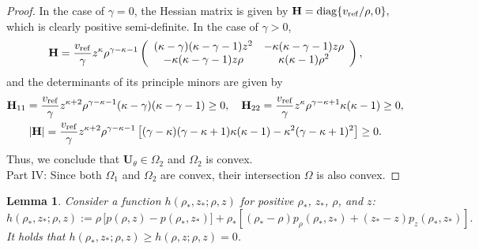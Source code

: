 \documentclass[times,final]{elsarticle}
\newtheorem{lemma}[theorem]{Lemma}
\numberwithin{equation}{section}
\theoremstyle{definition}
\theoremstyle{remark}
\newcommand{\BU}{\mathbf{U}}
\begin{document}
\begin{proof}
	In the case of $\gamma = 0$, the Hessian matrix is given by
	\(
	\mathbf{H}
	= {\rm diag}\{ v_{\rm ref}/\rho, 0  \}, 
	\)
	which is clearly positive semi-definite.
	In the case of $\gamma > 0$,
	\[
	\mathbf{H}
	=
	\frac{v_{\rm ref}}{\gamma}z^{\kappa}\rho^{\gamma-\kappa-1}
	\left(\begin{array}{cc} 
		(\kappa-\gamma)(\kappa-\gamma-1) z^2
		& -\kappa(\kappa-\gamma-1)z\rho \\ 
		-\kappa(\kappa-\gamma-1)z\rho
		& \kappa (\kappa-1) \rho^2
	\end{array}\right),
	\]
	and the determinants of its principle minors are given by
	\begin{gather*}
		\mathbf{H}_{11}
		= 
		\frac{v_{\rm ref}}{\gamma}z^{\kappa+2}\rho^{\gamma-\kappa-1}
		(\kappa-\gamma)(\kappa-\gamma-1)
		\ge 0,
		\quad
		\mathbf{H}_{22}
		= 
		\frac{v_{\rm ref}}{\gamma}z^{\kappa}\rho^{\gamma-\kappa+1}
		\kappa (\kappa-1) 
		\ge 0,
		\\
		|\mathbf{H}|
		=
		\frac{v_{\rm ref}}{\gamma}z^{\kappa+2}\rho^{\gamma-\kappa-1}
		\left[
		(\gamma-\kappa)(\gamma-\kappa+1) \kappa(\kappa-1)-\kappa^2(\gamma-\kappa+1)^2
		\right]
		\ge 0.
	\end{gather*}
	Thus, we conclude that $\BU_\theta \in \Omega_2$ and $\Omega_2$ is convex. \\
	{\sf Part IV}: Since both $\Omega_1$ and $\Omega_2$ are convex, their intersection $\Omega$ is also convex.
\end{proof}

\begin{lemma}\label{lem:791}
	Consider a function $h(\rho_*,z_*;\rho,z)$ for positive $\rho_*$, $z_*$, $\rho$, and $z$:
	\[
	h(\rho_*,z_*;\rho,z)
	:=
	\rho \, \Big[ p(\rho, z) - p(\rho_*, z_*) \Big]
	+
	\rho_*\left[
	\left(\rho_*-\rho\right) p_{\rho} (\rho_*, z_*)
	+
	\left(z_*-z\right) p_{z} (\rho_*, z_*)
	\right].
	\]
	It holds that 
	$h(\rho_*,z_*;\rho,z) \ge h(\rho,z;\rho,z) = 0$.
\end{lemma}
\end{document}
